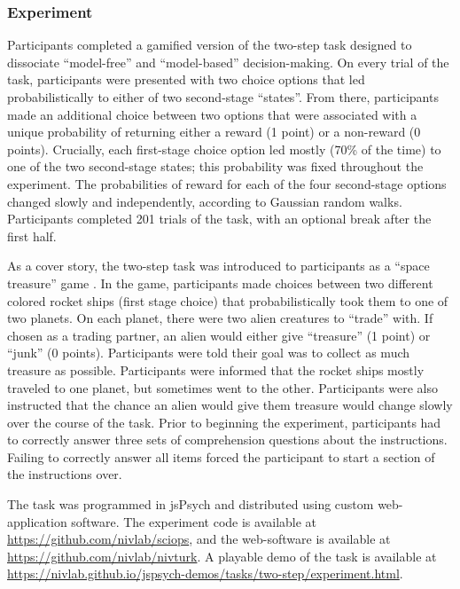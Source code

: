 \documentclass[a4paper,notitlepage,12pt]{article}
\begin{document}
\begin{refsection}[supp]
\subsubsection*{Experiment}

Participants completed a gamified version of the two-step task \cite{daw2011model} designed to dissociate ``model-free'' and ``model-based'' decision-making. On every trial of the task, participants were presented with two choice options that led probabilistically to either of two second-stage ``states''. From there, participants made an additional choice between two options that were associated with a unique probability of returning either a reward (1 point) or a non-reward (0 points). Crucially, each first-stage choice option led mostly (70\% of the time) to one of the two second-stage states; this probability was fixed throughout the experiment. The probabilities of reward for each of the four second-stage options changed slowly and independently, according to Gaussian random walks. Participants completed 201 trials of the task, with an optional break after the first half. 

As a cover story, the two-step task was introduced to participants as a ``space treasure'' game \cite{decker2016creatures}. In the game, participants made choices between two different colored rocket ships (first stage choice) that probabilistically took them to one of two planets. On each planet, there were two alien creatures to ``trade'' with. If chosen as a trading partner, an alien would either give ``treasure'' (1 point) or ``junk'' (0 points). Participants were told their goal was to collect as much treasure as possible. Participants were informed that the rocket ships mostly traveled to one planet, but sometimes went to the other. Participants were also instructed that the chance an alien would give them treasure would change slowly over the course of the task. Prior to beginning the experiment, participants had to correctly answer three sets of comprehension questions about the instructions. Failing to correctly answer all items forced the participant to start a section of the instructions over.

The task was programmed in jsPsych \cite{deleeuw_2015_jspsych-2} and distributed using custom web-application software. The experiment code is available at \url{https://github.com/nivlab/sciops}, and the web-software is available at \url{https://github.com/nivlab/nivturk}. A playable demo of the task is available at \url{https://nivlab.github.io/jspsych-demos/tasks/two-step/experiment.html}.


\end{refsection}
\end{document}
